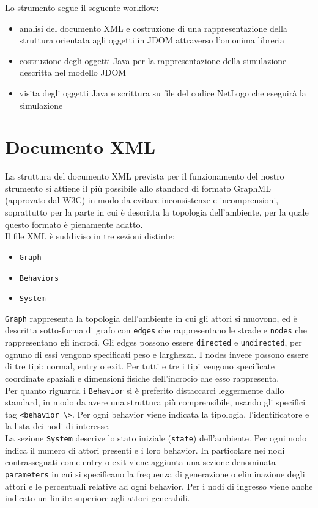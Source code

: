 Lo strumento segue il seguente workflow:
\begin{itemize}
\item analisi del documento XML e costruzione di una rappresentazione della struttura orientata agli oggetti in JDOM attraverso l'omonima libreria
\item costruzione degli oggetti Java per la rappresentazione della simulazione descritta nel modello JDOM 
\item visita degli oggetti Java e scrittura su file del codice NetLogo che eseguirà la simulazione
\end{itemize}

\section{Documento XML}
La struttura del documento XML prevista per il funzionamento del nostro strumento si attiene il più possibile allo standard di formato GraphML \cite{graphml} (approvato dal W3C) in modo da evitare inconsistenze e incomprensioni, soprattutto per la parte in cui è descritta la topologia dell'ambiente, per la quale questo formato è pienamente adatto.\\
Il file XML è suddiviso in tre sezioni distinte:
\begin{itemize}
\item \texttt{Graph}
\item \texttt{Behaviors}
\item \texttt{System}
\end{itemize} 
\texttt{Graph} rappresenta la topologia dell'ambiente in cui gli attori si muovono, ed è descritta sotto-forma di grafo con \texttt{edges} che rappresentano le strade e \texttt{nodes} che rappresentano gli incroci. Gli edges possono essere \texttt{directed} e \texttt{undirected}, per ognuno di essi vengono specificati peso e larghezza. I nodes invece possono essere di tre tipi: normal, entry o exit. Per tutti e tre i tipi vengono specificate coordinate spaziali e dimensioni fisiche dell'incrocio che esso rappresenta.\\
Per quanto riguarda i \texttt{Behavior} si è preferito distaccarci leggermente dallo standard, in modo da avere una struttura più comprensibile, usando gli specifici tag \texttt{<behavior \textbackslash>}. Per ogni behavior viene indicata la tipologia, l'identificatore e la lista dei nodi di interesse.\\
La sezione \texttt{System} descrive lo stato iniziale (\texttt{state}) dell'ambiente. Per ogni nodo indica il numero di attori presenti e i loro behavior. In particolare nei nodi contrassegnati come entry o exit viene aggiunta una sezione denominata \texttt{parameters} in cui si specificano la frequenza di generazione o eliminazione degli attori e le percentuali relative ad ogni behavior. Per i nodi di ingresso viene anche indicato un limite superiore agli attori generabili.

